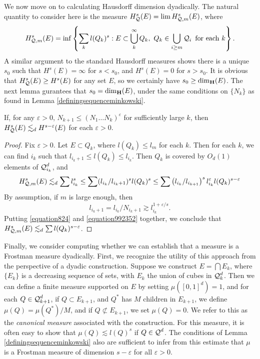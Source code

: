 We now move on to calculating Hausdorff dimension dyadically. The natural quantity to consider here is the measure $H^s_{\operatorname{\mathcal{Q}}}(E) = \lim H^s_{\operatorname{\mathcal{Q}},m}(E)$, where
%
\[ H^s_{\operatorname{\mathcal{Q}},m}(E) = \inf \left\{ \sum_k l(Q_k)^s : E \subset \bigcup_k^\infty Q_k,\ Q_k \in \bigcup_{i \geq m} \operatorname{\mathcal{Q}}_i\ \text{for each $k$} \right\}. \]
%
A similar argument to the standard Hausdorff measures shows there is a unique $s_0$ such that $H^s(E) = \infty$ for $s < s_0$, and $H^s(E) = 0$ for $s > s_0$. It is obvious that $H^s_{\operatorname{\mathcal{Q}}}(E) \geq H^s(E)$ for any set $E$, so we certainly have $s_0 \geq \operatorname{\dim_{\mathbf{H}}}(E)$. The next lemma gurantees that $s_0 = \operatorname{\dim_{\mathbf{H}}}(E)$, under the same conditions on $\{ N_k \}$ as found in Lemma \ref{definingsequenceminkowski}.

\begin{lemma} \label{lemma51464}
	If, for any $\varepsilon > 0$, $N_{k+1} \leq (N_1 \dots N_k)^\varepsilon$ for sufficiently large $k$, then $H^s_{\operatorname{\mathcal{Q}}}(E) \lesssim_d H^{s-\varepsilon}(E)$ for each $\varepsilon > 0$.
\end{lemma}
\begin{proof}
	Fix $\varepsilon > 0$. Let $E \subset Q_k$, where $l(Q_k) \leq l_m$ for each $k$. Then for each $k$, we can find $i_k$ such that $l_{i_k+1} \leq l(Q_k) \leq l_{i_k}$. Then $Q_k$ is covered by $O_d(1)$ elements of $\operatorname{\mathcal{Q}}_{i_k}^d$, and
	\begin{equation} \label{equation824} H^s_{\operatorname{\mathcal{Q}},m}(E) \lesssim_d \sum l_{i_k}^s \leq \sum (l_{i_k}/l_{i_k+1})^s l(Q_k)^s \leq \sum \left( l_{i_k}/l_{i_{k+1}} \right)^s l_{i_k}^\varepsilon l(Q_k)^{s - \varepsilon} \end{equation}
	By assumption, if $m$ is large enough, then
	\begin{equation} \label{equation992352}
		l_{i_k+1} = l_{i_k}/N_{i_k+1} \gtrsim l_{i_k}^{1 + \varepsilon/s}.
	\end{equation}
	Putting \eqref{equation824} and \eqref{equation992352} together, we conclude that $H^s_{\operatorname{\mathcal{Q}},m}(E) \lesssim_d \sum l(Q_k)^{s-\varepsilon}$.
\end{proof}

Finally, we consider computing whether we can establish that a measure is a Frostman measure dyadically. First, we recognize the utility of this approach from the perspective of a dyadic construction. Suppose we construct $E = \bigcap E_k$, where $\{ E_k \}$ is a decreasing sequence of sets, with $E_k$ the union of cubes in $\operatorname{\mathcal{Q}}_k^d$. Then we can define a finite measure supported on $E$ by setting $\mu([0,1]^d) = 1$, and for each $Q \in \operatorname{\mathcal{Q}}_{k+1}^d$, if $Q \subset E_{k+1}$, and $Q^*$ has $M$ children in $E_{k+1}$, we define $\mu(Q) = \mu(Q^*)/M$, and if $Q \not \subset E_{k+1}$, we set $\mu(Q) = 0$. We refer to this as the \emph{canonical measure} associated with the construction. For this measure, it is often easy to show that $\mu(Q) \lesssim l(Q)^s$ if $Q \in \operatorname{\mathcal{Q}}^d$. The conditions of Lemma \ref{definingsequenceminkowski} also are sufficient to infer from this estimate that $\mu$ is a Frostman measure of dimension $s - \varepsilon$ for all $\varepsilon > 0$.

